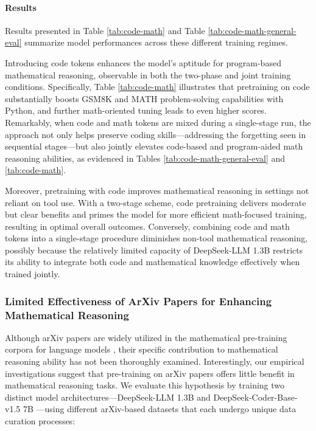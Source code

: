 {\paragraph{Results}
Results presented in Table \ref{tab:code-math} and Table \ref{tab:code-math-general-eval} summarize model performances across these different training regimes.

Introducing code tokens enhances the model’s aptitude for program-based mathematical reasoning, observable in both the two-phase and joint training conditions. Specifically, Table \ref{tab:code-math} illustrates that pretraining on code substantially boosts GSM8K and MATH problem-solving capabilities with Python, and further math-oriented tuning leads to even higher scores. Remarkably, when code and math tokens are mixed during a single-stage run, the approach not only helps preserve coding skills—addressing the forgetting seen in sequential stages—but also jointly elevates code-based and program-aided math reasoning abilities, as evidenced in Tables \ref{tab:code-math-general-eval} and \ref{tab:code-math}.

Moreover, pretraining with code improves mathematical reasoning in settings not reliant on tool use. With a two-stage scheme, code pretraining delivers moderate but clear benefits and primes the model for more efficient math-focused training, resulting in optimal overall outcomes. Conversely, combining code and math tokens into a single-stage procedure diminishes non-tool mathematical reasoning, possibly because the relatively limited capacity of DeepSeek-LLM 1.3B restricts its ability to integrate both code and mathematical knowledge effectively when trained jointly.

\subsubsection{Limited Effectiveness of ArXiv Papers for Enhancing Mathematical Reasoning}

Although arXiv papers are widely utilized in the mathematical pre-training corpora for language models \citep{minerva,gpt-f,llemma,mathpile}, their specific contribution to mathematical reasoning ability has not been thoroughly examined. Interestingly, our empirical investigations suggest that pre-training on arXiv papers offers little benefit in mathematical reasoning tasks. We evaluate this hypothesis by training two distinct model architectures—DeepSeek-LLM 1.3B and DeepSeek-Coder-Base-v1.5 7B \citep{deepseek-coder}—using different arXiv-based datasets that each undergo unique data curation processes:

}
